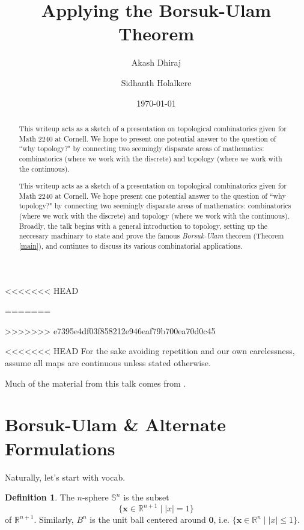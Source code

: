 \documentclass[12pt]{amsart}
\theoremstyle{definition}
\newtheorem{dfn}[thm]{Definition}
\begin{document}
\title{Applying the Borsuk-Ulam Theorem} \author{Akash Dhiraj}
 \author{Sidhanth Holalkere} \email{}
\date{\today}

<<<<<<< HEAD
    \begin{abstract}
        This writeup acts as a sketch of a presentation on topological combinatorics given for Math 2240 at Cornell. We hope to present one potential answer to the question of ``why topology?" by connecting two seemingly disparate areas of mathematics: combinatorics (where we work with the discrete) and topology (where we work with the continuous).
    \end{abstract}
=======
\begin{abstract}
  This writeup acts as a sketch of a presentation on topological
  combinatorics given for Math 2240 at Cornell. We hope present one
  potential answer to the question of ``why topology?" by connecting
  two seemingly disparate areas of mathematics: combinatorics (where
  we work with the discrete) and topology (where we work with the
  continuous). Broadly, the talk begins with a general introduction to
  topology, setting up the neccesary machinary to state and prove the
  famous \emph{Borsuk-Ulam} theorem (Theorem \ref{main}), and
  continues to discuss its various combinatorial applications.
\end{abstract}
>>>>>>> e7395e4df03f858212e946eaf79b700ea70d0c45

\maketitle

<<<<<<< HEAD
    For the sake avoiding repetition and our own carelessness, assume all maps are continuous unless stated otherwise. 
    
    Much of the material from this talk comes from \cite{topcombi}.

    \section{Borsuk-Ulam \& Alternate Formulations}

    Naturally, let's start with vocab.

    \begin{dfn}
    The $n$-sphere $\mathbb S^n$ is the subset $$\{\mathbf x \in \mathbb R^{n+1} \mid |x| = 1\}$$ of $\mathbb R^{n+1}$. Similarly, $B^n$ is the unit ball centered around $\mathbf 0$, i.e. $\{\mathbf x \in \mathbb R^n \mid |x| \leq 1\}$.
    \end{dfn}
\end{document}
